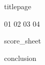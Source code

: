 \documentclass[a4paper,12pt]{article}
\begin{document}
{titlepage}
\clearpage
  \setcounter{page}{2}
  \tableofcontents
\clearpage

{01}
{02}
{03}
{04}

\clearpage
  {score_sheet}
\clearpage

\clearpage
  {conclusion}
\clearpage
\end{document}
